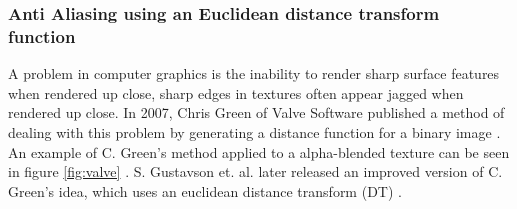 \documentclass{article}
\begin{document}
\subsubsection{Anti Aliasing using an Euclidean distance transform function}
A problem in computer graphics is the inability to render sharp surface features when rendered up close, sharp edges in textures often appear jagged when rendered up close. In 2007, Chris Green of Valve Software published a method of dealing with this problem by generating a distance function for a binary image \cite{green2007improved}. An example of C. Green's method applied to a  alpha-blended texture can be seen in figure \ref{fig:valve} \cite{green2007improved}. S. Gustavson et. al. later released an improved version of C. Green's idea, which uses an euclidean distance transform (DT) \cite{gustavson2011anti}\cite{gustavson20122d}. 
\end{document}
